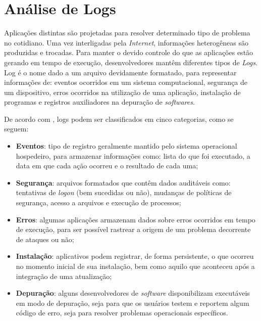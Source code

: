 \section{Análise de Logs}
    
    \vspace{10.5cm}
    
    \hspace{1cm}
    Aplicações distintas são projetadas para resolver determinado tipo de problema no cotidiano. Uma vez interligadas pela \textit{Internet}, informações heterogêneas são produzidas e trocadas. Para manter o devido controle do que as aplicações estão gerando em tempo de execução, desenvolvedores mantêm diferentes tipos de \textit{Logs}. Log é o nome dado a um arquivo devidamente formatado, para representar informações de: eventos ocorridos em um sistema computacional, segurança de um dispositivo, erros ocorridos na utilização de uma aplicação, instalação de programas e registros auxiliadores na depuração de \textit{softwares}.
    
    \vspace{4mm}
    
    \hspace{1cm}
    De acordo com , logs podem ser classificados em cinco categorias, como se seguem:
    
    \begin{itemize}
        \item \textbf{Eventos}: tipo de registro geralmente mantido pelo sistema operacional hospedeiro, para armazenar informações como: lista do que foi executado, a data em que cada ação ocorreu e o resultado de cada uma;
        \item \textbf{Segurança}: arquivos formatados que contêm dados auditáveis como: tentativas de \textit{logon} (bem sucedidas ou não), mudanças de políticas de segurança, acesso a arquivos e execução de processos;
        \item \textbf{Erros}: algumas aplicações armazenam dados sobre erros ocorridos em tempo de execução, para ser possível rastrear a origem de um problema decorrente de ataques ou não;
        \item \textbf{Instalação}: aplicativos podem registrar, de forma persistente, o que ocorreu no momento inicial de sua instalação, bem como aquilo que aconteceu após a integração de uma atualização;
        \item \textbf{Depuração}: alguns desenvolvedores de \textit{software} disponibilizam executáveis em modo de depuração, seja para que os usuários testem e reportem algum código de erro, seja para resolver problemas operacionais específicos.
    \end{itemize}
    
